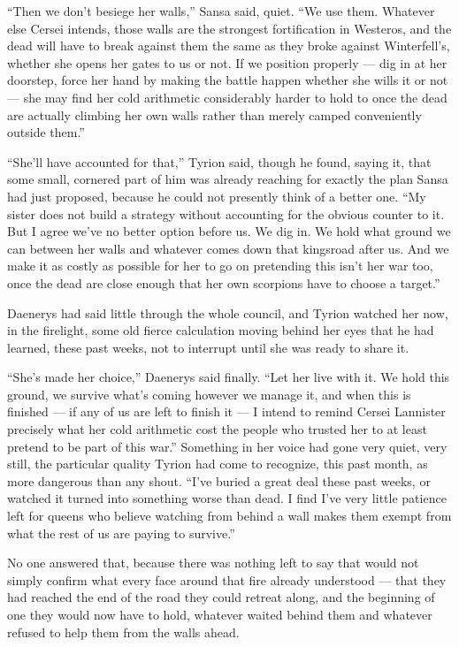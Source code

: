 “Then we don’t besiege her walls,” Sansa said, quiet. “We use them. Whatever else Cersei intends, those walls are the strongest fortification in Westeros, and the dead will have to break against them the same as they broke against Winterfell’s, whether she opens her gates to us or not. If we position properly — dig in at her doorstep, force her hand by making the battle happen whether she wills it or not — she may find her cold arithmetic considerably harder to hold to once the dead are actually climbing her own walls rather than merely camped conveniently outside them.”

“She’ll have accounted for that,” Tyrion said, though he found, saying it, that some small, cornered part of him was already reaching for exactly the plan Sansa had just proposed, because he could not presently think of a better one. “My sister does not build a strategy without accounting for the obvious counter to it. But I agree we’ve no better option before us. We dig in. We hold what ground we can between her walls and whatever comes down that kingsroad after us. And we make it as costly as possible for her to go on pretending this isn’t her war too, once the dead are close enough that her own scorpions have to choose a target.”

Daenerys had said little through the whole council, and Tyrion watched her now, in the firelight, some old fierce calculation moving behind her eyes that he had learned, these past weeks, not to interrupt until she was ready to share it.

“She’s made her choice,” Daenerys said finally. “Let her live with it. We hold this ground, we survive what’s coming however we manage it, and when this is finished — if any of us are left to finish it — I intend to remind Cersei Lannister precisely what her cold arithmetic cost the people who trusted her to at least pretend to be part of this war.” Something in her voice had gone very quiet, very still, the particular quality Tyrion had come to recognize, this past month, as more dangerous than any shout. “I’ve buried a great deal these past weeks, or watched it turned into something worse than dead. I find I’ve very little patience left for queens who believe watching from behind a wall makes them exempt from what the rest of us are paying to survive.”

No one answered that, because there was nothing left to say that would not simply confirm what every face around that fire already understood — that they had reached the end of the road they could retreat along, and the beginning of one they would now have to hold, whatever waited behind them and whatever refused to help them from the walls ahead.

